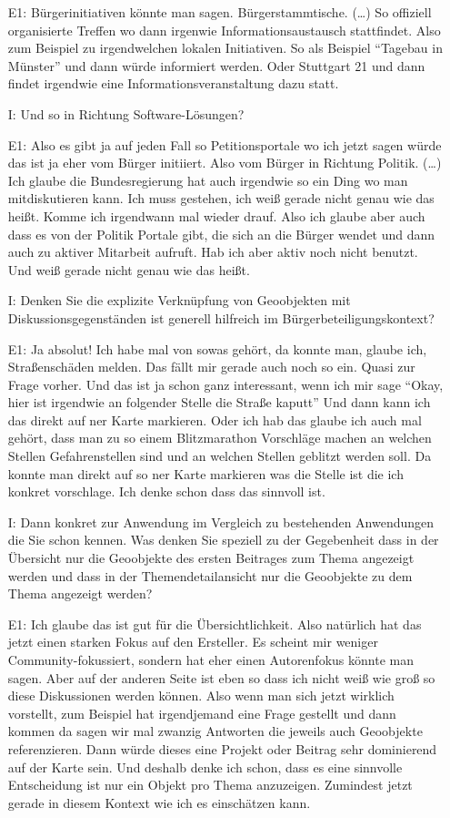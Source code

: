\begin{itemize}
    \item[E1:] B{\"u}rgerinitiativen k{\"o}nnte man sagen. B{\"u}rgerstammtische. (\dots) So offiziell organisierte Treffen wo dann irgenwie Informationsaustausch stattfindet. Also zum Beispiel zu irgendwelchen lokalen Initiativen. So als Beispiel "`Tagebau in M{\"u}nster"' und dann w{\"u}rde informiert werden. Oder Stuttgart 21 und dann findet irgendwie eine Informationsveranstaltung dazu statt. 
    \item[I:] Und so in Richtung Software-L{\"o}sungen?
    \item[E1:] Also es gibt ja auf jeden Fall so Petitionsportale wo ich jetzt sagen w{\"u}rde das ist ja eher vom B{\"u}rger initiiert. Also vom B{\"u}rger in Richtung Politik. (\dots) Ich glaube die Bundesregierung hat auch irgendwie so ein Ding wo man mitdiskutieren kann. Ich muss gestehen, ich wei{\ss} gerade nicht genau wie das hei{\ss}t. Komme ich irgendwann mal wieder drauf. Also ich glaube aber auch dass es von der Politik Portale gibt, die sich an die B{\"u}rger wendet und dann auch zu aktiver Mitarbeit aufruft. Hab ich aber aktiv noch nicht benutzt. Und wei{\ss} gerade nicht genau wie das hei{\ss}t. 
    \item[I:] Denken Sie die explizite Verkn{\"u}pfung von Geoobjekten mit Diskussionsgegenst{\"a}nden ist generell hilfreich im B{\"u}rgerbeteiligungskontext?
    \item[E1:] Ja absolut! Ich habe mal von sowas geh{\"o}rt, da konnte man, glaube ich, Stra{\ss}ensch{\"a}den melden. Das f{\"a}llt mir gerade auch noch so ein. Quasi zur Frage vorher. Und das ist ja schon ganz interessant, wenn ich mir sage "`Okay, hier ist irgendwie an folgender Stelle die Stra{\ss}e kaputt"' Und dann kann ich das direkt auf ner Karte markieren. Oder ich hab das glaube ich auch mal geh{\"o}rt, dass man zu so einem Blitzmarathon Vorschl{\"a}ge machen an welchen Stellen Gefahrenstellen sind und an welchen Stellen geblitzt werden soll. Da konnte man direkt auf so ner Karte markieren was die Stelle ist die ich konkret vorschlage. Ich denke schon dass das sinnvoll ist. 
    \item[I:] Dann konkret zur Anwendung im Vergleich zu bestehenden Anwendungen die Sie schon kennen. Was denken Sie speziell zu der Gegebenheit dass in der {\"U}bersicht nur die Geoobjekte des ersten Beitrages zum Thema angezeigt werden und dass in der Themendetailansicht nur die Geoobjekte zu dem Thema angezeigt werden?
    \item[E1:] Ich glaube das ist gut f{\"u}r die {\"U}bersichtlichkeit. Also nat{\"u}rlich hat das jetzt einen starken Fokus auf den Ersteller. Es scheint mir weniger Community-fokussiert, sondern hat eher einen Autorenfokus k{\"o}nnte man sagen. Aber auf der anderen Seite ist eben so dass ich nicht wei{\ss} wie gro{\ss} so diese Diskussionen werden k{\"o}nnen. Also wenn man sich jetzt wirklich vorstellt, zum Beispiel hat irgendjemand eine Frage gestellt und dann kommen da sagen wir mal zwanzig Antworten die jeweils auch Geoobjekte referenzieren. Dann w{\"u}rde dieses eine Projekt oder Beitrag sehr dominierend auf der Karte sein. Und deshalb denke ich schon, dass es eine sinnvolle Entscheidung ist nur ein Objekt pro Thema anzuzeigen. Zumindest jetzt gerade in diesem Kontext wie ich es einsch{\"a}tzen kann.

\end{itemize}
